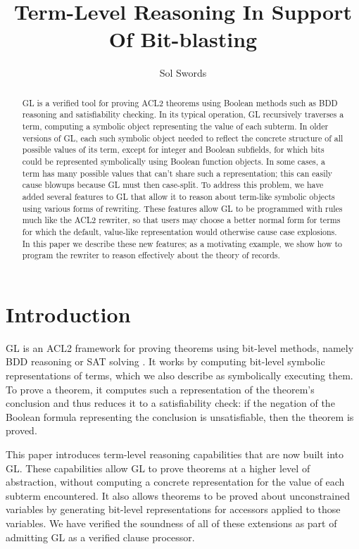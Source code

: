 \documentclass[submission,copyright,creativecommons]{eptcs}
\title{Term-Level Reasoning In Support Of Bit-blasting}
\author{Sol Swords
\institute{Centaur Techology, Inc.\\
Austin, TX, USA}
\email{sswords@centtech.com}
}
\begin{document}
\maketitle

\begin{abstract}

  GL is a verified tool for proving ACL2 theorems using Boolean
  methods such as BDD reasoning and satisfiability checking.  In its
  typical operation, GL recursively traverses a term, computing a
  symbolic object representing the value of each subterm.  In older
  versions of GL, each such symbolic object needed to reflect the
  concrete structure of all possible values of its term, except for
  integer and Boolean subfields, for which bits could be represented
  symbolically using Boolean function objects.  In some cases, a term
  has many possible values that can't share such a
  representation; this can easily cause blowups because GL must then
  case-split.  To address this problem, we have added several features
  to GL that allow it to reason about term-like symbolic objects using
  various forms of rewriting.  These features allow GL to be
  programmed with rules much like the ACL2 rewriter, so that users may
  choose a better normal form for terms for which the default,
  value-like representation would otherwise cause case explosions.  In
  this paper we describe these new features; as a motivating example,
  we show how to program the rewriter to reason effectively about the
  theory of records.

\end{abstract}

\section{Introduction}
\label{sec:intro}

GL is an ACL2 framework for proving theorems using bit-level methods,
namely BDD reasoning or SAT solving \cite{bit-blasting-GL, gl-diss}.
It works by computing bit-level symbolic representations of terms,
which we also describe as symbolically executing them.  To prove a
theorem, it computes such a representation of the theorem's conclusion
and thus reduces it to a satisfiability check: if the negation of the Boolean formula
representing the conclusion is unsatisfiable, then the theorem is
proved.

This paper introduces term-level reasoning capabilities that are now
built into GL.  These capabilities allow GL to prove theorems at a
higher level of abstraction, without computing a concrete
representation for the value of each subterm encountered.  It also
allows theorems to be proved about unconstrained variables by
generating bit-level representations for accessors applied to those
variables.  We have verified the soundness of all of these extensions
as part of admitting GL as a verified clause processor.
\end{document}
